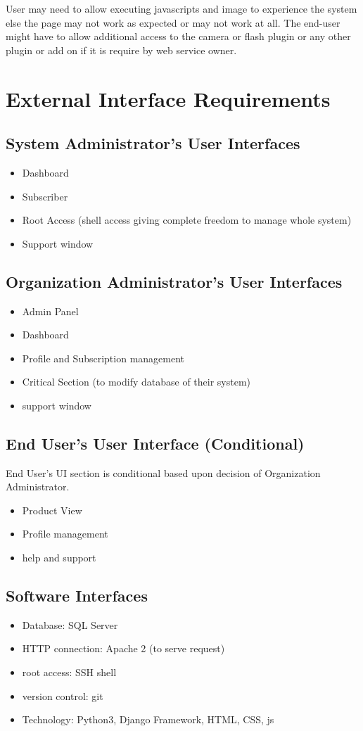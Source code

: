 \documentclass{scrreprt}
\def\superuser{System Administrator}
\def\admin{Organization Administrator}
\def\user{End User}
\begin{document}
User may need to allow executing javascripts and image to experience the system else the page may not work as expected or may not work at all.
The end-user might have to allow additional access to the camera or flash plugin or any other plugin or add on if it is require by web service owner.
 

\chapter{External Interface Requirements}
\section{\superuser's User Interfaces}
\begin{itemize}
	\item Dashboard 
	\item Subscriber
	\item Root Access (shell access giving complete freedom to manage whole system)
	\item Support window
\end{itemize}

\section{\admin's User Interfaces}
\begin{itemize}
	\item Admin Panel
	\item Dashboard
	\item Profile and Subscription management
	\item Critical Section (to modify database of their system)
	\item support window
\end{itemize}

\section{\user's User Interface (Conditional)}
\space \user's UI section is conditional based upon decision of \admin.
\begin{itemize}
	\item Product View
	\item Profile management
	\item help and support
\end{itemize}

\section{Software Interfaces}
\begin{itemize}
	\item Database: SQL Server
	\item HTTP connection: Apache 2 (to serve request)
	\item root access: SSH shell
	\item version control: git
	\item Technology: Python3, Django Framework, HTML, CSS, js
\end{itemize}
\end{document}
